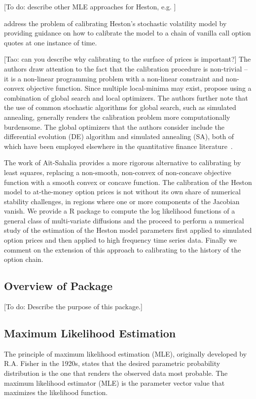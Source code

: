 \documentclass{article}
\begin{document}
[To do: describe other MLE approaches for Heston, e.g. \cite{Mariani2008}]


\cite{MIKHAILOV2003} address the problem of calibrating Heston's stochastic volatility model by providing guidance on how to calibrate the model to a chain of vanilla call option quotes at one instance of time.

[Tao: can you describe why calibrating to the surface of prices is important?]
The authors draw attention to the fact that the calibration procedure is non-trivial -- it is a non-linear programming problem with a non-linear constraint and non-convex objective function. Since multiple local-minima may exist, \cite{MIKHAILOV2003} propose using a combination of global search and local optimizers.  The authors further note that the use of common stochastic algorithms for global search, such as simulated annealing, generally renders the calibration problem more computationally burdensome. The global optimizers that the authors consider include the differential evolution (DE) algorithm and simulated annealing (SA), both of which have been employed elsewhere in the quantitative finance literature~\cite{ARDIA2011}.


The work of A\"{i}t-Sahalia provides a more rigorous alternative to calibrating by least squares, replacing a non-smooth, non-convex of non-concave objective function with a smooth convex or concave function. The calibration of the Heston model to at-the-money option prices is not without its own share of numerical stability challenges, in regions where one or more components of the Jacobian vanish. We provide a R package to compute the log likelihood functions of a general class of multi-variate diffusions and the proceed to perform a numerical study of the estimation of the Heston model parameters first applied to simulated option prices and then applied to high frequency time series data. Finally we comment on the extension of this approach to calibrating to the history of the option chain.

\subsection{Overview of Package}

[To do: Describe the purpose of this package.]

\subsection{Maximum Likelihood Estimation}
The  principle  of
maximum   likelihood   estimation
(MLE), originally developed by R.A. Fisher in the
1920s, states that the desired parametric probability distribution is
the one that renders the observed data most probable.  The maximum likelihood estimator (MLE) is the parameter vector value that maximizes the likelihood function.
\end{document}
